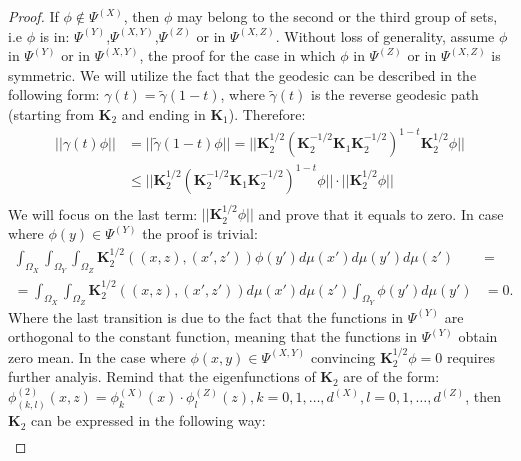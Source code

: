 \documentclass[]{article}
\theoremstyle{definition}
\begin{document}
	\begin{proof}
		If $\phi \notin \Psi^{(X)}$, then $\phi$ may belong to the second or the third group of sets, i.e $\phi$ is in: $\Psi^{(Y)}$,$\Psi^{(X,Y)}$,$\Psi^{(Z)}$ or in $\Psi^{(X,Z)}$.
		Without loss of generality, assume $\phi$ in $\Psi^{(Y)}$ or in $\Psi^{(X,Y)}$, the proof for the case in which $\phi$ in $\Psi^{(Z)}$ or in $\Psi^{(X,Z)}$ is symmetric.
		We will utilize the fact that the geodesic can be described in the following form: $\gamma(t)=\tilde{\gamma}(1-t)$, where $\tilde{\gamma}(t)$ is the reverse geodesic path (starting from $\mathbf{K}_2$ and ending in $\mathbf{K}_1$). Therefore:
		\begin{equation}
		\label{eq:CSeq}
		\begin{aligned}
				||\gamma(t) \phi|| &= ||\tilde{\gamma}(1-t) \phi|| = || \mathbf{K}_2^{1/2}(\mathbf{K}_2^{-1/2}\mathbf{K}_1\mathbf{K}_2^{-1/2})^{1-t}\mathbf{K}_2^{1/2} \phi|| \\ &\leq  || \mathbf{K}_2^{1/2}(\mathbf{K}_2^{-1/2}\mathbf{K}_1\mathbf{K}_2^{-1/2})^{1-t} \phi || \cdot ||\mathbf{K}_2^{1/2}\phi|| \\
		\end{aligned}
		\end{equation}  
	   We will focus on the last term: $||\mathbf{K}_2^{1/2}\phi||$ and prove that it equals to zero.
	   In case where $\phi(y) \in \Psi^{(Y)}$ the proof is trivial:
	   \begin{equation}
	   \begin{aligned}
	   \int_{\Omega_X}\int_{\Omega_Y}\int_{\Omega_Z} \mathbf{K}_2^{1/2}((x,z),(x',z')) \phi(y') d\mu(x')d\mu(y')d\mu(z') &= \\
	   =\int_{\Omega_X}\int_{\Omega_Z} \mathbf{K}_2^{1/2}((x,z),(x',z'))d\mu(x')d\mu(z') \int_{\Omega_Y}\phi(y')d\mu(y') &= 0.
	   \end{aligned}
	   \end{equation}
	   Where the last transition is due to the fact that the functions in $\Psi^{(Y)}$ are orthogonal to the constant function, meaning that the functions in $\Psi^{(Y)}$ obtain zero mean.
	   In the case where $\phi(x,y) \in \Psi^{(X,Y)}$ convincing $\mathbf{K}_2^{1/2}\phi=0$ requires further analyis.
	   Remind that the eigenfunctions of $\mathbf{K}_2$ are of the form: $\phi^{(2)}_{(k,l)}(x,z) = \phi^{(X)}_k(x) \cdot \phi^{(Z)}_l(z), k=0,1,\ldots,d^{(X)}, l=0,1,\ldots,d^{(Z)}$, then $\mathbf{K}_2$ can be expressed in the following way: 
	   \begin{equation}
	   \begin{aligned}

\end{aligned}
\end{equation}
\end{proof}
\end{document}
